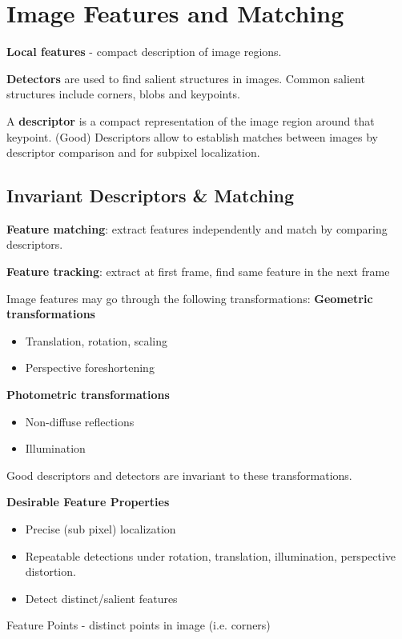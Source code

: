 \section{Image Features and Matching}

\textbf{Local features} - compact description of image regions.

\textbf{Detectors} are used to find salient structures in images. Common salient structures include corners, blobs
and keypoints.

A \textbf{descriptor} is a compact representation of the image region around that keypoint. (Good) Descriptors allow to establish matches between images by descriptor comparison and for subpixel localization.

\subsection{Invariant Descriptors \& Matching}

\textbf{Feature matching}: extract features independently and match by comparing descriptors.

\textbf{Feature tracking}: extract at first frame, find same feature in the next frame

Image features may go through the following transformations: 
\textbf{Geometric transformations}
\begin{itemize}
\item Translation, rotation, scaling
\item Perspective foreshortening 
\end{itemize}

\textbf{Photometric transformations}
\begin{itemize}
\item Non-diffuse reflections 
\item Illumination
\end{itemize}

Good descriptors and detectors are invariant to these transformations. 

\textbf{Desirable Feature Properties}
\begin{itemize} 
\item Precise (sub pixel) localization
\item Repeatable detections under rotation, translation, illumination, perspective distortion.
\item Detect distinct/salient features
\end{itemize}

Feature Points - distinct points in image (i.e. corners)

